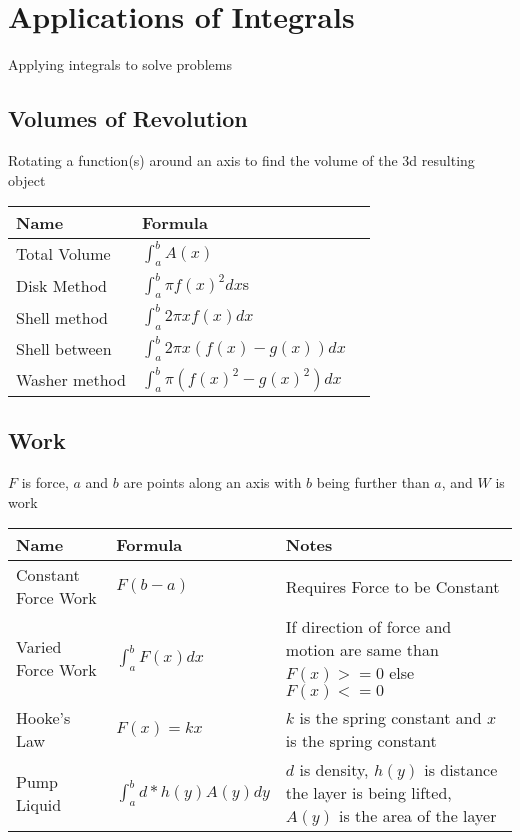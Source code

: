 \documentclass[17pt]{extarticle}
\begin{document}
\section{Applications of Integrals}
Applying integrals to solve problems
\subsection{Volumes of Revolution}
Rotating a function(s) around an axis to find the volume of the 3d resulting object
\renewcommand{\arraystretch}{2}
\begin{table}[H]
\centering
\begin{tabular}{|l|l|l|}
\hline
\rowcolor{githublightgray}
Name & Formula\\
\hline
Total Volume & $\int_{a}^{b}A(x)$\\
\hline
Disk Method &$\int_{a}^{b}\pi f(x)^2dx$s\\
\hline
Shell method &$\int_{a}^{b}2\pi xf(x)dx$\\
\hline
Shell between &$\int_{a}^{b}2\pi x(f(x)-g(x))dx$\\
\hline
Washer method &$\int_{a}^{b}\pi(f(x)^2-g(x)^2)dx$\\
\hline
\end{tabular}
\end{table}

\clearpage
\subsection{Work}
$F$ is force, $a$ and $b$ are points along an axis with $b$ being further than $a$, and $W$ is work\\
\renewcommand{\arraystretch}{2}
\begin{table}[H]
\centering
\begin{tabular}{|l|l|l|}
\hline
\rowcolor{githublightgray}
Name & Formula & Notes\\
\hline
Constant Force Work&$F(b-a)$&Requires Force to be Constant\\
\hline
Varied Force Work&$\int_{a}^{b}F(x)dx$&\makecell[l]{If direction of force and motion are \\same than $F(x)>=0$ else $F(x)<=0$}\\
\hline
Hooke's Law&$F(x)=kx$&\makecell[l]{$k$ is the spring constant and $x$ is the \\spring constant}\\
\hline
Pump Liquid&$\int_{a}^{b}d*h(y)A(y)dy$&\makecell[l]{$d$ is density, $h(y)$ is distance the layer\\ is being lifted, $A(y)$ is the area of the \\layer}\\
\hline
\end{tabular} 
\end{table}
\end{document}
